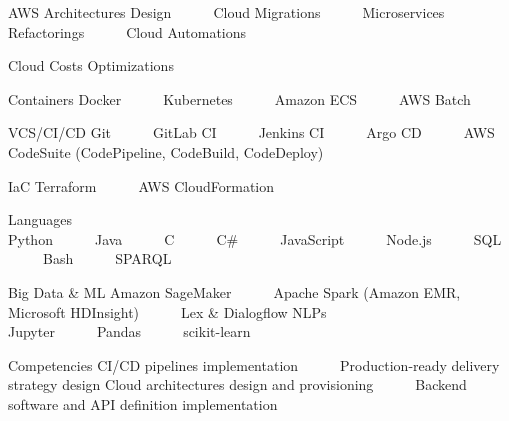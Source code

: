 

\begin{cvskills}

\cvskill
{AWS} %
{Architectures Design~~~\textbullet~~~Cloud Migrations~~~\textbullet~~~Microservices Refactorings~~~\textbullet~~~Cloud Automations} %

\cvskill
{} %
{Cloud Costs Optimizations} %

\cvskill
{Containers} %
{Docker~~~\textbullet~~~Kubernetes~~~\textbullet~~~Amazon ECS~~~\textbullet~~~AWS Batch} %


\cvskill
{VCS/CI/CD}%
{Git~~~\textbullet~~~GitLab CI~~~\textbullet~~~Jenkins CI~~~\textbullet~~~Argo CD~~~\textbullet~~~AWS CodeSuite (CodePipeline, CodeBuild, CodeDeploy)} %


\cvskill
{IaC} %
{Terraform~~~\textbullet~~~AWS CloudFormation} %


  \cvskill
    {Languages} %
    {Python~~~\textbullet~~~Java~~~\textbullet~~~C~~~\textbullet~~~C\#~~~\textbullet~~~JavaScript~~~\textbullet~~~Node.js~~~\textbullet~~~SQL~~~\textbullet~~~Bash~~~\textbullet~~~SPARQL} %

\cvskill
{Big Data \& ML} %
{Amazon SageMaker~~~\textbullet~~~Apache Spark (Amazon EMR, Microsoft HDInsight)~~~\textbullet~~~Lex \& Dialogflow NLPs} %
\cvskill
{} %
{Jupyter~~~\textbullet~~~Pandas~~~\textbullet~~~scikit-learn} %

  \cvskill
{Competencies} %
{CI/CD pipelines implementation~~~\textbullet~~~Production-ready delivery strategy design} %
  \cvskill
{} %
{Cloud architectures design and provisioning~~~\textbullet~~~Backend software and API definition implementation} %
    

\end{cvskills}
